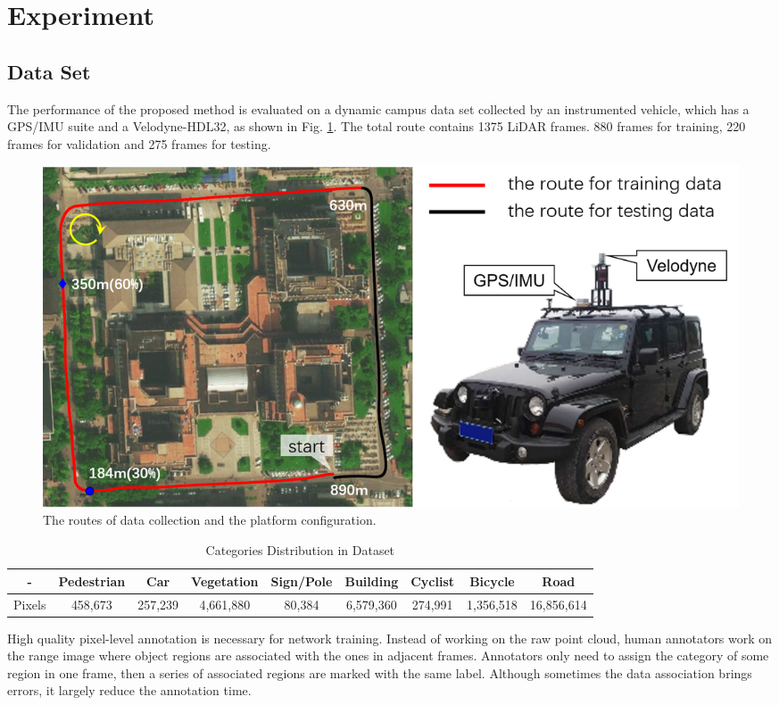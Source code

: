 \section{Experiment}
\subsection{Data Set}
The performance of the proposed method is evaluated on a dynamic campus data set collected by an instrumented vehicle, which has a GPS/IMU suite and a Velodyne-HDL32, as shown in Fig. \ref{fig:collect_route}. The total route contains 1375 LiDAR frames. 880 frames for training, 220 frames for validation and 275 frames for testing.

\begin{figure}[ht]
\centering
\includegraphics[width=1.0\linewidth]{fig/collect_route}
\caption{The routes of data collection and the platform configuration.}
\label{fig:collect_route}
\end{figure}

\begin{table}
		\caption{Categories Distribution in Dataset}
		\label{category_distribution}
		\centering
		\small
		\renewcommand{\arraystretch}{1.5}
		\begin{tabular}{|c|c|c|c|c|c|c|c|c|}
			\hline
			 - & Pedestrian & Car & Vegetation & Sign/Pole & Building & Cyclist & Bicycle & Road	\\
			\hline
			Pixels & 458,673 & 257,239 & 4,661,880 & 80,384 & 6,579,360 & 274,991 & 1,356,518 & 16,856,614	\\
			\hline
		\end{tabular}
\end{table}

High quality pixel-level annotation is necessary for network training. Instead of working on the raw point cloud, human annotators work on the range image where object regions are associated with the ones in adjacent frames. Annotators only need to assign the category of some region in one frame, then a series of associated regions are marked with the same label. Although sometimes the data association brings errors, it largely reduce the annotation time. 

